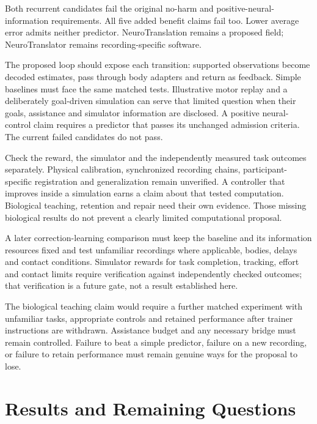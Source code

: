 Both recurrent candidates fail the original no-harm and positive-neural-information requirements. All five added benefit claims fail too. Lower average error admits neither predictor. NeuroTranslation remains a proposed field; NeuroTranslator remains recording-specific software.

The proposed loop should expose each transition: supported observations become decoded estimates, pass through body adapters and return as feedback. Simple baselines must face the same matched tests. Illustrative motor replay and a deliberately goal-driven simulation can serve that limited question when their goals, assistance and simulator information are disclosed. A positive neural-control claim requires a predictor that passes its unchanged admission criteria. The current failed candidates do not pass.

Check the reward, the simulator and the independently measured task outcomes separately. Physical calibration, synchronized recording chains, participant-specific registration and generalization remain unverified. A controller that improves inside a simulation earns a claim about that tested computation. Biological teaching, retention and repair need their own evidence. Those missing biological results do not prevent a clearly limited computational proposal.

A later correction-learning comparison must keep the baseline and its information
resources fixed and test unfamiliar recordings where applicable, bodies, delays
and contact conditions. Simulator rewards for task completion, tracking, effort
and contact limits require verification against independently checked outcomes;
that verification is a future gate, not a result established here.

The biological teaching claim would require a further matched experiment with
unfamiliar tasks, appropriate controls and retained performance after trainer
instructions are withdrawn. Assistance budget and any necessary bridge must
remain controlled. Failure to beat a simple predictor, failure on a new
recording, or failure to retain performance must remain genuine ways for the
proposal to lose.






\section{Results and Remaining Questions}

